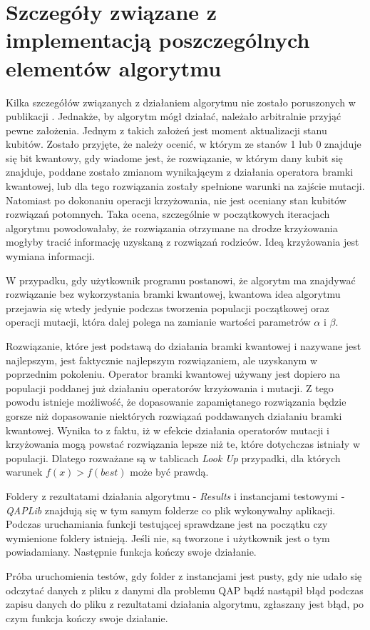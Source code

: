 \section{Szczegóły związane z implementacją poszczególnych elementów algorytmu}
Kilka szczegółów związanych z działaniem algorytmu nie zostało poruszonych w publikacji \cite{NPQGA}. Jednakże, by algorytm mógł działać, należało arbitralnie przyjąć pewne założenia. Jednym z takich założeń jest moment aktualizacji stanu kubitów. Zostało przyjęte, że należy ocenić, w którym ze stanów 1 lub 0 znajduje się bit kwantowy, gdy wiadome jest, że rozwiązanie, w którym dany kubit się znajduje, poddane zostało zmianom wynikającym z działania operatora bramki kwantowej, lub dla tego rozwiązania zostały spełnione warunki na zajście mutacji. Natomiast po dokonaniu operacji krzyżowania, nie jest oceniany stan kubitów rozwiązań potomnych. Taka ocena, szczególnie w początkowych iteracjach algorytmu powodowałaby, że rozwiązania otrzymane na drodze krzyżowania mogłyby tracić informację uzyskaną z rozwiązań rodziców. Ideą krzyżowania jest wymiana informacji.

W przypadku, gdy użytkownik programu postanowi, że algorytm ma znajdywać rozwiązanie bez wykorzystania bramki kwantowej, kwantowa idea algorytmu przejawia się wtedy jedynie podczas tworzenia populacji początkowej oraz operacji mutacji, która dalej polega na zamianie wartości parametrów $\alpha$ i $\beta$.

Rozwiązanie, które jest podstawą do działania bramki kwantowej i nazywane jest najlepszym, jest faktycznie najlepszym rozwiązaniem, ale uzyskanym w poprzednim pokoleniu. Operator bramki kwantowej używany jest dopiero na populacji poddanej już działaniu operatorów krzyżowania i mutacji. Z tego powodu istnieje możliwość, że dopasowanie zapamiętanego rozwiązania będzie gorsze niż dopasowanie niektórych rozwiązań poddawanych działaniu bramki kwantowej. Wynika to z faktu, iż w efekcie działania operatorów mutacji i krzyżowania mogą powstać rozwiązania lepsze niż te, które dotychczas istniały w populacji. Dlatego rozważane są w tablicach \textit{Look Up} przypadki, dla których warunek $f(x)>f(best)$ może być prawdą.

Foldery z rezultatami działania algorytmu - \textit{Results} i instancjami testowymi - \textit{QAPLib} znajdują się w tym samym folderze co plik wykonywalny aplikacji. Podczas uruchamiania funkcji testującej sprawdzane jest na początku czy wymienione foldery istnieją. Jeśli nie, są tworzone i użytkownik jest o tym powiadamiany. Następnie funkcja kończy swoje działanie.

Próba uruchomienia testów, gdy folder z instancjami jest pusty, gdy nie udało się odczytać danych z pliku z danymi dla problemu QAP bądź nastąpił błąd podczas zapisu danych do pliku z rezultatami działania algorytmu, zgłaszany jest błąd, po czym funkcja kończy swoje działanie.